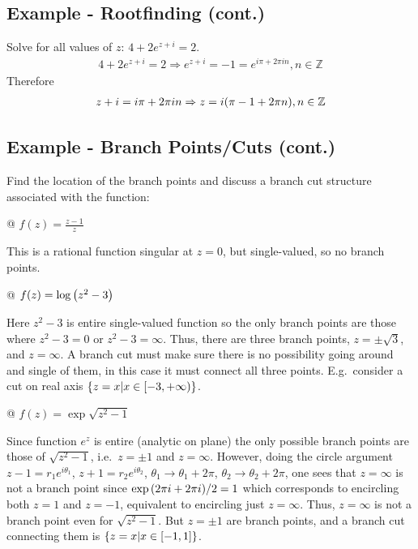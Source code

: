     \subsection{Example - Rootfinding (cont.)}
    Solve for all values of $z$: $4 + 2e^{z + i} = 2$.
    \begin{align*}
        4 + 2e^{z + i} = 2 \Rightarrow
        e^{z+i} = -1 = e^{i\pi + 2\pi i n}, n \in \mathbb{Z}
    \end{align*}
    Therefore
    \begin{align*}
        z+i = i \pi + 2 \pi i n \Rightarrow
        z = i{\left( \pi - 1 + 2 \pi n \right)}, n \in \mathbb{Z}
    \end{align*}

    \subsection{Example - Branch Points/Cuts (cont.)}
    Find the location of the branch points and discuss a branch cut
    structure associated with the function:
    \begin{easylist}[itemize]
        @ $f(z) = \frac{z - 1}{z}$

        This is a rational function singular at $z=0$, but single-valued, so
        no branch points.

        @ $f(z) = \log{\left( z^2 - 3 \right)}$

        Here $z^2 - 3$ is entire single-valued function so the only branch
        points are those where $z^2 - 3 = 0$ or $z^2 - 3 = \infty$. Thus,
        there are three branch points, $z=\pm\sqrt{3}$, and $z=\infty$. A
        branch cut must make sure there is no possibility going around and
        single of them, in this case it must connect all three points. E.g.\
        consider a cut on real axis ${\left\{ z=x|x\in[-3,+\infty) \right\}}$.

        @ $f(z) = \exp{\sqrt{z^2 - 1}}$

        Since function $e^z$ is entire (analytic on plane) the only possible
        branch points are those of $\sqrt{z^2-1}$, i.e.\ $z = \pm 1$ and
        $z=\infty$. However, doing the circle argument
        $z-1=r_1e^{i\theta_1}$, $z+1=r_2e^{i\theta_2}$,
        $\theta_1\to\theta_1+2\pi$, $\theta_2\to\theta_2+2\pi$, one sees
        that $z=\infty$ is not a branch point since $\exp{{\left( 2\pi i + 2
        \pi i \right)} / 2} = 1$ which corresponds to encircling both $z=1$ and
        $z=-1$, equivalent to encircling just $z=\infty$. Thus, $z=\infty$
        is not a branch point even for $\sqrt{z^2 - 1}$. But $z=\pm 1$ are
        branch points, and a branch cut connecting them is
        ${\left\{ z=x|x\in[-1,1] \right\}}$.
    \end{easylist}

